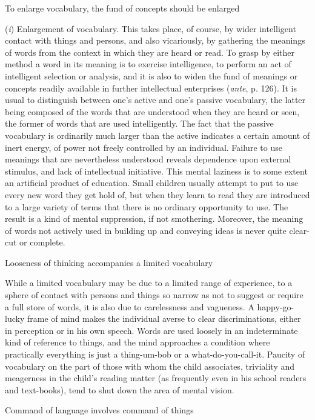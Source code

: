 \documentclass[letterpaper]{book}
\begin{document}
To enlarge vocabulary, the fund of concepts should be enlarged

(\emph{i}) Enlargement of vocabulary. This takes place, of course, by
wider intelligent contact with things and persons, and also vicariously,
by gathering the meanings of words from the context in which they are
heard or read. To grasp by either method a word in its meaning is to
exercise intelligence, to perform an act of intelligent selection or
analysis, and it is also to widen the fund of meanings or concepts
readily available in further intellectual enterprises (\emph{ante}, p.
126). It is usual to distinguish between one's active and one's passive
vocabulary, the latter being composed of the words that are understood
when they are heard or seen, the former of words that are used
intelligently. The fact that the passive vocabulary is ordinarily much
larger than the active indicates a certain amount of inert energy, of
power not freely controlled by an individual. Failure to use meanings
that are nevertheless understood reveals dependence upon external
stimulus, and lack of intellectual initiative. This mental laziness is
to some extent an artificial product of education. Small children
usually attempt to put to use every new word they get hold of, but when
they learn to read they are introduced to a large variety of terms that
there is no ordinary opportunity to
use.
The result is a kind of mental suppression, if not smothering. Moreover,
the meaning of words not actively used in building up and conveying
ideas is never quite clear-cut or complete.

Looseness of thinking accompanies a limited vocabulary

While a limited vocabulary may be due to a limited range of experience,
to a sphere of contact with persons and things so narrow as not to
suggest or require a full store of words, it is also due to carelessness
and vagueness. A happy-go-lucky frame of mind makes the individual
averse to clear discriminations, either in perception or in his own
speech. Words are used loosely in an indeterminate kind of reference to
things, and the mind approaches a condition where practically everything
is just a thing-um-bob or a what-do-you-call-it. Paucity of vocabulary
on the part of those with whom the child associates, triviality and
meagerness in the child's reading matter (as frequently even in his
school readers and text-books), tend to shut down the area of mental
vision.

Command of language involves command of things
\end{document}
